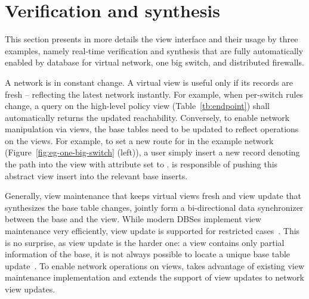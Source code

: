 \section{Verification and synthesis}
\label{sec:veri-syn}

This section presents in more details the view interface and their
usage by three examples, namely real-time verification and synthesis
that are fully automatically enabled by database for virtual network,
one big switch, and distributed firewalls.




A network is in constant change. A virtual view is useful only if its
records are fresh -- reflecting the latest network instantly. For
example, when per-switch rules change, a query on the high-level
policy view  (Table~\ref{tb:endpoint}) shall
automatically returns the updated  reachability. Conversely,
to enable network manipulation via views, the base tables need to be
updated to reflect operations on the views.  For example, to set a new
route  for  in the example network
(Figure~\ref{fig:eg-one-big-switch} (left)), a user simply insert a new
record denoting the path into the  view with
 attribute set to . \Sys is responsible of pushing this
abstract view insert into the relevant base 
inserts.

Generally, view maintenance that keeps virtual views fresh and view
update that synthesizes the base table changes, jointly form a
bi-directional data synchronizer between the base and the view. While
modern DBSes implement view maintenance very efficiently, view update
is supported for restricted
cases~\cite{ak-view-udpate-thesis,relational-lenses}. This is no
surprise, as view update is the harder one: a view contains only partial
information of the base, it is not always possible to locate a unique
base table update~\cite{Bancilhon:view-update-semantics}. To enable
network operations on views, \Sys takes advantage of existing view
maintenance implementation and extends the support of view updates to
network view updates.

